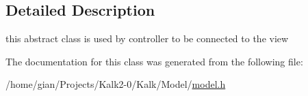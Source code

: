 \subsection{Detailed Description}
this abstract class is used by controller to be connected to the view 

The documentation for this class was generated from the following file\+:\begin{DoxyCompactItemize}
\item 
/home/gian/\+Projects/\+Kalk2-\/0/\+Kalk/\+Model/\hyperlink{model_8h}{model.\+h}\end{DoxyCompactItemize}

